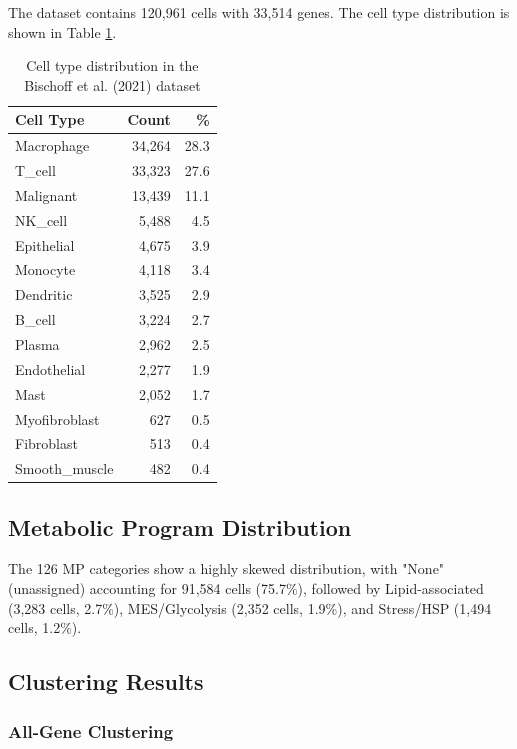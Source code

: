\documentclass[11pt,a4paper]{article}
\begin{document}
The dataset contains 120,961 cells with 33,514 genes. The cell type distribution is shown in Table \ref{tab:cell_type_dist}.

\begin{table}[h!]
\centering
\caption{Cell type distribution in the Bischoff et al. (2021) dataset}
\label{tab:cell_type_dist}
\begin{tabular}{lrr}
\toprule
\textbf{Cell Type} & \textbf{Count} & \textbf{\%} \\
\midrule
Macrophage & 34,264 & 28.3 \\
T\_cell & 33,323 & 27.6 \\
Malignant & 13,439 & 11.1 \\
NK\_cell & 5,488 & 4.5 \\
Epithelial & 4,675 & 3.9 \\
Monocyte & 4,118 & 3.4 \\
Dendritic & 3,525 & 2.9 \\
B\_cell & 3,224 & 2.7 \\
Plasma & 2,962 & 2.5 \\
Endothelial & 2,277 & 1.9 \\
Mast & 2,052 & 1.7 \\
Myofibroblast & 627 & 0.5 \\
Fibroblast & 513 & 0.4 \\
Smooth\_muscle & 482 & 0.4 \\
\bottomrule
\end{tabular}
\end{table}

\subsection{Metabolic Program Distribution}

The 126 MP categories show a highly skewed distribution, with "None" (unassigned) accounting for 91,584 cells (75.7\%), followed by Lipid-associated (3,283 cells, 2.7\%), MES/Glycolysis (2,352 cells, 1.9\%), and Stress/HSP (1,494 cells, 1.2\%).

\subsection{Clustering Results}

\subsubsection{All-Gene Clustering}
\end{document}
